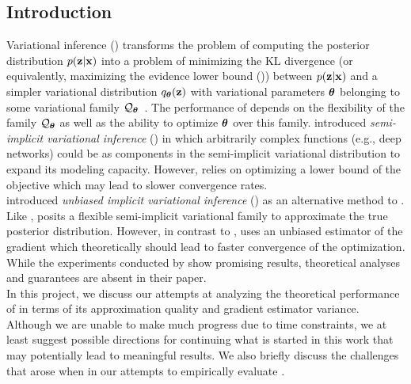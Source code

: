 \documentclass[10pt]{article}
\begin{document}
\vspace{2em}
\begin{abstract}
\todo
\end{abstract}
\vspace{2em}

\subsection{Introduction} \label{sec:introduction}

Variational inference (\vi) transforms the problem of computing the posterior distribution $p(\mathbf{z}|\mathbf{x})$ into a problem of minimizing the KL divergence (or equivalently, maximizing the evidence lower bound (\elbo)) between $p(\mathbf{z}|\mathbf{x})$ and a simpler variational distribution $q_{\bm{\theta}}(\mathbf{z})$ with variational parameters ${\bm{\theta}}$ belonging to some variational family $\mathcal{Q}_{\bm{\theta}}$~\citep{Jordan:1999}. The performance of \vi depends on the flexibility of the family $\mathcal{Q}_{\bm{\theta}}$ as well as the ability to optimize ${\bm{\theta}}$ over this family. \citet{Yin:2018} introduced \textit{semi-implicit variational inference} (\sivi) in which arbitrarily complex functions (e.g., deep networks) could be as components in the semi-implicit variational distribution to expand its modeling capacity. However, \sivi relies on optimizing a lower bound of the \elbo objective which may lead to slower convergence rates.
\\

\citet{Titsias:2019} introduced \textit{unbiased implicit variational inference} (\uivi) as an alternative method to \sivi. Like \sivi, \uivi posits a flexible semi-implicit variational family to approximate the true posterior distribution. However, in contrast to \sivi, \uivi uses an unbiased estimator of the \elbo gradient which theoretically should lead to faster convergence of the optimization. While the experiments conducted by \citet{Titsias:2019} show promising results, theoretical analyses and guarantees are absent in their paper.
\\

In this project, we discuss our attempts at analyzing the theoretical performance of \uivi in terms of its approximation quality and gradient estimator variance. Although we are unable to make much progress due to time constraints, we at least suggest possible directions for continuing what is started in this work that may potentially lead to meaningful results. We also briefly discuss the challenges that arose when in our attempts to empirically evaluate \uivi.
\\
\end{document}
